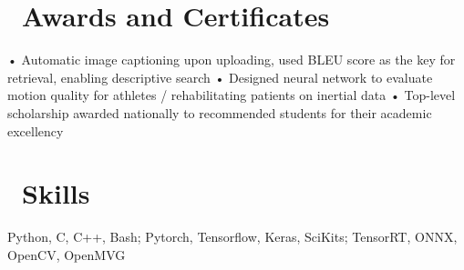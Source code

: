\documentclass{resume}
\begin{document}
\section{\faHeartO\ Awards and Certificates}
{• Automatic image captioning upon uploading, used BLEU score as the key for retrieval, enabling descriptive search}\vspace{0.8mm}
{•  Designed neural network to evaluate motion quality for athletes / rehabilitating patients on inertial data}\vspace{0.8mm}
{•  Top-level scholarship awarded nationally to recommended students for their academic excellency}{\vspace{0.8mm}}

\section{\faDesktop\ Skills}
Python, C, C++, Bash; Pytorch, Tensorflow, Keras, SciKits; TensorRT, ONNX, OpenCV, OpenMVG
\end{document}
